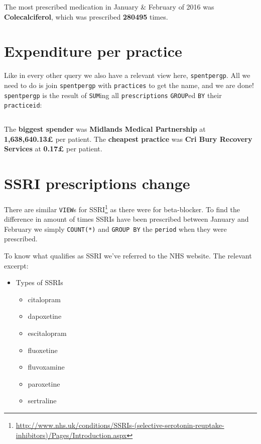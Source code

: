 \documentclass[english,a4paper,]{report}
\renewcommand{\href}[2]{#2\footnote{\url{#1}}}
\providecommand{\tightlist}{%
  \setlength{\itemsep}{0pt}\setlength{\parskip}{0pt}}
\begin{document}
\inputminted[firstline=42,lastline=53]{sql}{src/sql/02-queries.sql}

The most prescribed medication in January \& February of 2016 was
\textbf{Colecalciferol}, which was prescribed \textbf{280495} times.

\section{Expenditure per practice}\label{expenditure-per-practice}

Like in every other query we also have a relevant view here,
\texttt{spentpergp}. All we need to do is join \texttt{spentpergp} with
\texttt{practices} to get the name, and we are done! \texttt{spentpergp}
is the result of \texttt{SUM}ing all \texttt{prescriptions}
\texttt{GROUP}ed \texttt{BY} their \texttt{practiceid}:

\inputminted[firstline=56,lastline=80]{sql}{src/sql/02-queries.sql}

The \textbf{biggest spender} was \textbf{Midlands Medical Partnership}
at \textbf{1,638,640.13£} per patient. The \textbf{cheapest practice}
was \textbf{Cri Bury Recovery Services} at \textbf{0.17£} per patient.

\section{SSRI prescriptions change}\label{ssri-prescriptions-change}

There are similar \texttt{VIEW}s for
\href{http://www.nhs.uk/conditions/SSRIs-(selective-serotonin-reuptake-inhibitors)/Pages/Introduction.aspx}{SSRI}
as there were for beta-blocker. To find the difference in amount of
times SSRIs have been prescribed between January and February we simply
\texttt{COUNT(*)} and \texttt{GROUP\ BY} the \texttt{period} when they
were prescribed.

To know what qualifies as SSRI we've referred to the NHS website. The
relevant excerpt:

\begin{itemize}
\tightlist
\item
  Types of SSRIs

  \begin{itemize}
  \tightlist
  \item
    citalopram
  \item
    dapoxetine
  \item
    escitalopram
  \item
    fluoxetine
  \item
    fluvoxamine
  \item
    paroxetine
  \item
    sertraline
  \end{itemize}
\end{itemize}
\end{document}

